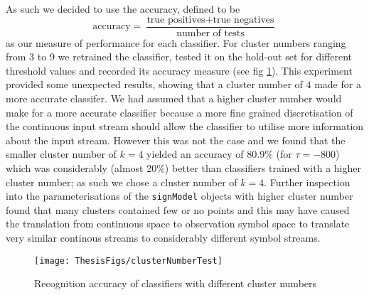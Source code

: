 As such we decided to use the accuracy, defined to be 
\begin{equation*}
\text{accuracy} = \frac{\text{true positives}+\text{true negatives}}{\text{number of tests}}
\end{equation*}
as our measure of performance for each classifier. For cluster numbers ranging from $3$ to $9$ we retrained the classifier, tested it on the hold-out set for different threshold values and recorded its accuracy measure (see fig \ref{fig:clustTest}). This experiment provided some unexpected results, showing that a cluster number of $4$ made for a more accurate classifer. We had assumed that a higher cluster number would make for a more accurate classifier because a more fine grained discretisation of the continuous input stream should allow the classifier to utilise more information about the input stream. However this was not the case and we found that the smaller cluster number of $k=4$ yielded an accuracy of 80.9\% (for $\tau = -800$) which was considerably (almost 20\%) better than classifiers trained with a higher cluster number; as such we chose a cluster number of $k=4$. Further inspection into the parameterisations of the \verb|signModel| objects with higher cluster number found that many clusters contained few or no points and this may have caused the translation from continuous space to observation symbol space to translate very similar continous streams to considerably different symbol streams.

\begin{figure}[]
        \centering
        \texttt{[image: ThesisFigs/clusterNumberTest]}
        \caption{Recognition accuracy of classifiers with different cluster numbers}\label{fig:clustTest}
\end{figure}


